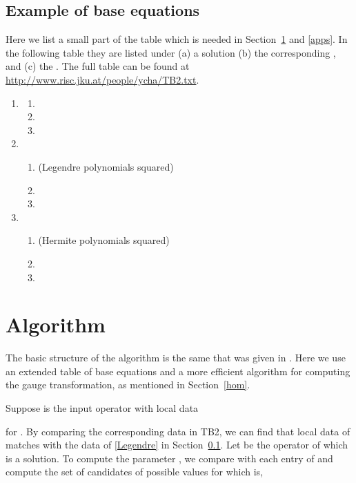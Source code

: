 \documentclass{article}
\begin{document}
\subsection{Example of base equations}
\label{sec:base}

Here we list a small part of the table which is needed in Section~\ref{sec:algo} and \ref{apps}.  In the
following table they are listed under (a) a solution (b) the corresponding , and (c) the . 
The full table can be found at
\url{http://www.risc.jku.at/people/ycha/TB2.txt}.



\begin{enumerate}


\item\label{ex2} 	
	\begin{enumerate}
	  \item 
	  \item 
	  \item 
	\end{enumerate}

\item 
	\begin{enumerate}\label{Legendre}
	  \item  (Legendre polynomials squared)
	  \item 
	  \item 
	\end{enumerate}

\item
	\begin{enumerate}
	  \item  (Hermite polynomials squared)
	  \item 
	  \item 
	\end{enumerate}
\end{enumerate}

\section{Algorithm}\label{sec:algo}

The basic structure of the algorithm is the same that was given in \cite{YC11}. Here we use an extended table of base equations and a more efficient algorithm for computing
the gauge transformation, as mentioned in Section~\ref{hom}.

Suppose  is the input operator with local data

for .
By comparing the corresponding data in TB2, we can find that local data of  matches with the data of \eqref{Legendre} in Section~\ref{sec:base}.
Let  be the operator of which  is a solution. To compute the parameter , we compare  with each entry of  
and compute the set of candidates of possible values for  which is, 
\end{document}
